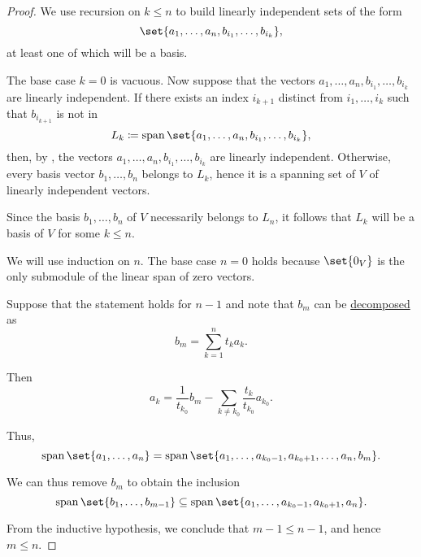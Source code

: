 \begin{proof}
  We use recursion on \( k \leq n \) to build linearly independent sets of the form
  \begin{equation*}
    \set{ a_1, \ldots, a_n, b_{i_1}, \ldots, b_{i_k} },
  \end{equation*}
  at least one of which will be a basis.

  The base case \( k = 0 \) is vacuous. Now suppose that the vectors \( a_1, \ldots, a_n, b_{i_1}, \ldots, b_{i_k} \) are linearly independent. If there exists an index \( i_{k+1} \) distinct from \( i_1, \ldots, i_k \) such that \( b_{i_{k+1}} \) is not in
  \begin{equation*}
    L_k \coloneqq \linspan\set{ a_1, \ldots, a_n, b_{i_1}, \ldots, b_{i_k} },
  \end{equation*}
  then, by , the vectors \( a_1, \ldots, a_n, b_{i_1}, \ldots, b_{i_k} \) are linearly independent. Otherwise, every basis vector \( b_1, \ldots, b_n \) belongs to \( L_k \), hence it is a spanning set of \( V \) of linearly independent vectors.

  Since the basis \( b_1, \ldots, b_n \) of \( V \) necessarily belongs to \( L_n \), it follows that \( L_k \) will be a basis of \( V \) for some \( k \leq n \).

   We will use induction on \( n \). The base case \( n = 0 \) holds because \( \set{ 0_V } \) is the only submodule of the linear span of zero vectors.

  Suppose that the statement holds for \( n - 1 \) and note that \( b_m \) can be \hyperref[def:basis_decomposition]{decomposed} as
  \begin{equation*}
    b_m = \sum_{k=1}^n t_k a_k.
  \end{equation*}

  Then
  \begin{equation*}
    a_k = \frac 1 {t_{k_0}} b_m - \sum_{k \neq k_0} \frac {t_k} {t_{k_0}} a_{k_0}.
  \end{equation*}

  Thus,
  \begin{equation*}
    \linspan\set{ a_1, \ldots, a_n } = \linspan\set{ a_1, \ldots, a_{k_0 - 1}, a_{k_0 + 1}, \ldots, a_n, b_m }.
  \end{equation*}

  We can thus remove \( b_m \) to obtain the inclusion
  \begin{equation*}
    \linspan\set{ b_1, \ldots, b_{m-1} } \subseteq \linspan\set{ a_1, \ldots, a_{k_0 - 1}, a_{k_0 + 1}, a_n }.
  \end{equation*}

  From the inductive hypothesis, we conclude that \( m - 1 \leq n - 1 \), and hence \( m \leq n \).
\end{proof}

